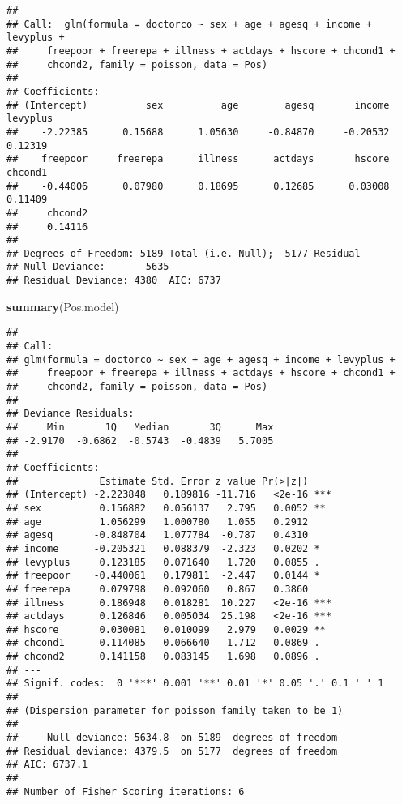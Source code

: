 \documentclass[
]{article}
\newenvironment{Shaded}{\begin{snugshade}}{\end{snugshade}}
\newcommand{\KeywordTok}[1]{\textcolor[rgb]{0.13,0.29,0.53}{\textbf{#1}}}
\newcommand{\NormalTok}[1]{#1}
\begin{document}
\begin{verbatim}
## 
## Call:  glm(formula = doctorco ~ sex + age + agesq + income + levyplus + 
##     freepoor + freerepa + illness + actdays + hscore + chcond1 + 
##     chcond2, family = poisson, data = Pos)
## 
## Coefficients:
## (Intercept)          sex          age        agesq       income     levyplus  
##    -2.22385      0.15688      1.05630     -0.84870     -0.20532      0.12319  
##    freepoor     freerepa      illness      actdays       hscore      chcond1  
##    -0.44006      0.07980      0.18695      0.12685      0.03008      0.11409  
##     chcond2  
##     0.14116  
## 
## Degrees of Freedom: 5189 Total (i.e. Null);  5177 Residual
## Null Deviance:       5635 
## Residual Deviance: 4380  AIC: 6737
\end{verbatim}

\begin{Shaded}
\begin{Highlighting}[]
\KeywordTok{summary}\NormalTok{(Pos.model)}
\end{Highlighting}
\end{Shaded}

\begin{verbatim}
## 
## Call:
## glm(formula = doctorco ~ sex + age + agesq + income + levyplus + 
##     freepoor + freerepa + illness + actdays + hscore + chcond1 + 
##     chcond2, family = poisson, data = Pos)
## 
## Deviance Residuals: 
##     Min       1Q   Median       3Q      Max  
## -2.9170  -0.6862  -0.5743  -0.4839   5.7005  
## 
## Coefficients:
##              Estimate Std. Error z value Pr(>|z|)    
## (Intercept) -2.223848   0.189816 -11.716   <2e-16 ***
## sex          0.156882   0.056137   2.795   0.0052 ** 
## age          1.056299   1.000780   1.055   0.2912    
## agesq       -0.848704   1.077784  -0.787   0.4310    
## income      -0.205321   0.088379  -2.323   0.0202 *  
## levyplus     0.123185   0.071640   1.720   0.0855 .  
## freepoor    -0.440061   0.179811  -2.447   0.0144 *  
## freerepa     0.079798   0.092060   0.867   0.3860    
## illness      0.186948   0.018281  10.227   <2e-16 ***
## actdays      0.126846   0.005034  25.198   <2e-16 ***
## hscore       0.030081   0.010099   2.979   0.0029 ** 
## chcond1      0.114085   0.066640   1.712   0.0869 .  
## chcond2      0.141158   0.083145   1.698   0.0896 .  
## ---
## Signif. codes:  0 '***' 0.001 '**' 0.01 '*' 0.05 '.' 0.1 ' ' 1
## 
## (Dispersion parameter for poisson family taken to be 1)
## 
##     Null deviance: 5634.8  on 5189  degrees of freedom
## Residual deviance: 4379.5  on 5177  degrees of freedom
## AIC: 6737.1
## 
## Number of Fisher Scoring iterations: 6
\end{verbatim}
\end{document}
